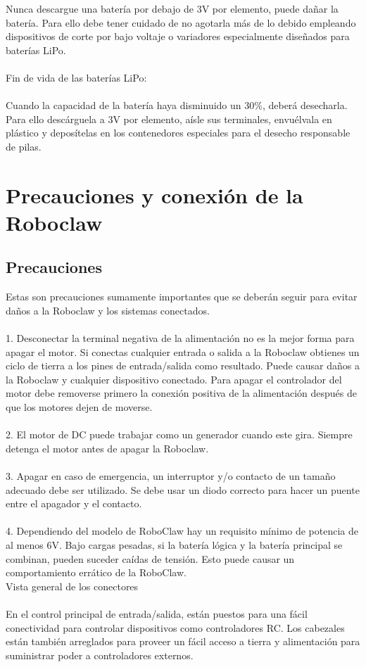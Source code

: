 \documentclass[user_manual.tex]{subfiles}
\begin{document}
Nunca descargue una batería por debajo de 3V por elemento, puede dañar la batería. Para ello debe tener cuidado de no 
agotarla más de lo debido empleando dispositivos de corte por bajo voltaje o variadores especialmente diseñados para 
baterías LiPo.\\
\\
Fin de vida de las baterías LiPo:\\
\\
Cuando la capacidad de la batería haya disminuido un 30\%, deberá desecharla. Para ello descárguela a 3V por elemento, 
aísle sus terminales, envuélvala en plástico y deposítelas en los contenedores especiales para el desecho responsable de 
pilas.\\

\section{Precauciones y conexión de la Roboclaw}

\subsection{Precauciones}
Estas son precauciones sumamente importantes que se deberán seguir para evitar daños a la Roboclaw y los sistemas conectados.\\
\\
1. Desconectar la terminal negativa de la alimentación no es la mejor forma para apagar el motor. Si conectas cualquier entrada o salida
a la Roboclaw obtienes un ciclo de tierra a los pines de entrada/salida como resultado. Puede causar daños a la Roboclaw y cualquier
dispositivo conectado. Para apagar el controlador del motor debe removerse primero la conexión positiva de la alimentación después de
que los motores dejen de moverse.\\
\\
2. El motor de DC puede trabajar como un generador cuando este gira. Siempre detenga el motor
antes de apagar la Roboclaw.\\
\\
3. Apagar en caso de emergencia, un interruptor y/o contacto de un tamaño adecuado debe ser utilizado. Se debe usar un diodo correcto para
hacer un puente entre el apagador y el contacto.\\
\\
4. Dependiendo del modelo de RoboClaw hay un requisito mínimo de potencia de al menos 6V. Bajo cargas pesadas, si la batería lógica y
la batería principal se combinan, pueden suceder caídas de tensión. Esto puede causar un comportamiento errático de la RoboClaw.\\
Vista general de los conectores\\
\\
En el control principal de entrada/salida, están puestos para una fácil conectividad para controlar dispositivos como controladores RC.
Los cabezales están también arreglados para proveer un fácil acceso a tierra  y alimentación para suministrar poder a controladores externos.
\end{document}

